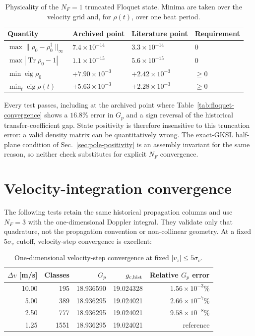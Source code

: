\documentclass[11pt,a4paper]{article}
\newcommand{\Tr}{\operatorname{Tr}}
\begin{document}
\begin{table}[ht]
\centering
\caption{Physicality of the $N_F=1$ truncated Floquet state. Minima are taken
over the velocity grid and, for $\rho(t)$, over one beat period.}
\label{tab:physicality}
\small
\begin{tabularx}{\textwidth}{L{4.4cm}C{3.0cm}C{3.0cm}Y}
\toprule
Quantity & Archived point & Literature point & Requirement\\
\midrule
$\max\|\rho_0-\rho_0^\dagger\|_\infty$ &
$7.4\times10^{-14}$ & $3.3\times10^{-14}$ & $0$\\
$\max|\Tr\rho_0-1|$ &
$1.1\times10^{-15}$ & $5.6\times10^{-15}$ & $0$\\
$\min\operatorname{eig}\rho_0$ &
$+7.90\times10^{-3}$ & $+2.42\times10^{-3}$ & $\geq0$\\
$\min_t\operatorname{eig}\rho(t)$ &
$+5.63\times10^{-3}$ & $+2.28\times10^{-3}$ & $\geq0$\\
\bottomrule
\end{tabularx}
\end{table}

Every test passes, including at the archived point where
Table~\ref{tab:floquet-convergence} shows a $16.8\%$ error in $G_p$ and a sign
reversal of the historical transfer-coefficient gap. State positivity is
therefore insensitive to this truncation error: a valid density matrix can be
quantitatively wrong. The exact-GKSL half-plane condition of
Sec.~\ref{sec:pole-positivity} is an assembly invariant for the same reason,
so neither check substitutes for explicit $N_F$ convergence.

\clearpage
\section{Velocity-integration convergence}

The following tests retain the same historical propagation columns and use
$N_F=3$ with the one-dimensional Doppler integral. They validate only that
quadrature, not the propagation convention or non-collinear geometry.
At a fixed $5\sigma_v$ cutoff, velocity-step convergence is excellent:

\begin{table}[ht]
\centering
\caption{One-dimensional velocity-step convergence at fixed
$|v_z|\leq5\sigma_v$.}
\label{tab:velocity-step}
\small
\begin{tabular}{r r r r r}
\toprule
$\Delta v$ [m/s] & Classes & $G_p$ & $g_{c,{\rm hist}}$ &
Relative $G_p$ error\\
\midrule
10.00 & 195 & 18.936590 & 19.024328 & $1.56\times10^{-3}\%$\\
5.00  & 389 & 18.936295 & 19.024021 & $2.66\times10^{-7}\%$\\
2.50  & 777 & 18.936295 & 19.024021 & $9.58\times10^{-8}\%$\\
1.25  & 1551 & 18.936295 & 19.024021 & reference\\
\bottomrule
\end{tabular}
\end{table}
\end{document}
